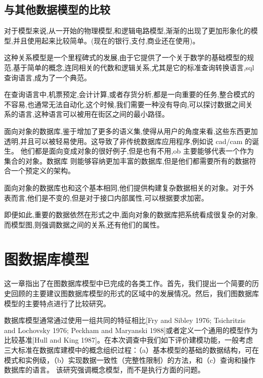 \documentclass[a4paper]{ecust_thesis_translation}
\begin{document}
	\subsection{与其他数据模型的比较}
		对于模型来说,从一开始的物理模型,和逻辑电路模型,渐渐的出现了更加形象化的模型,并且使用起来比较简单。(现在的银行,支付,商业还在使用)。	

		这种关系模型是一个里程碑式的发展,由于它提供了一个关于数学的基础模型的规范,基于简单的概念,连同相关的代数和逻辑关系,尤其是它的标准查询转换语言,sql 查询语言,成为了一个典范。	

		在查询语言中,机票预定,会计计算,或者存货分析,都是一向重要的任务,整合模式的不容易,也通常无法自动化,这个时候,我们需要一种没有导向,可以探讨数据之间关系的语言,这种语言可以被用在街区之间的最小路径。	

		面向对象的数据库,鉴于增加了更多的语义集,使得从用户的角度来看,这些东西更加透明,并且可以被轻易使用。这导致了非传统数据库应用程序,例如说 cad/cam 的诞生。	他们都是面向变成对象的很好例子,但是也有不用,ob 主要能够代表一个作为集合的对象。数据库 则能够容纳更加丰富的数据库,但是他们都需要所有的数据符合一个预定义的架构。	

		面向对象的数据库也和这个基本相同,他们提供构建复杂数据相关的对象。对于外表而言,他们是不变的,但是对于接口内部属性,可以根据要求加密。	
		
		即便如此,重要的数据依然在形式之中,面向对象的数据库把系统看成很复杂的对象,而模型图,则强调数据之间的关系,还有他们的属性。	
\section{图数据库模型}
	这一章指出了在图数据库模型中已完成的各类工作。首先，我们提出一个简要的历史回顾的主要建议图数据库模型的形式的区域中的发展情况。然后，我们图数据库模型的主要特点进行了比较研究。

	数据库模型通常通过使用一组共同的特征相比[Fry and Sibley 1976; Tsichritzis and Lochovsky 1976; Peckham and Maryanski 1988]或者定义一个通用的模型作为比较基准[Hull and King 1987]。在本次调查中我们如下评价建模功能，一般考虑三大标准在数据库建模中的概念组织过程：（a）基本模型的基础的数据结构，可在模式和实例级，（b）实现数据一致性（完整性限制）的方法，和（c）查询和操作数据库的语言。 该研究强调概念模型，而不是执行方面的问题。
\end{document}
